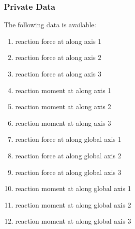 \subsubsection{Private Data}
The following data is available:
\begin{enumerate}
\item {} reaction force at  along  axis 1
\item {} reaction force at  along  axis 2
\item {} reaction force at  along  axis 3

\item {} reaction moment at  along  axis 1
\item {} reaction moment at  along  axis 2
\item {} reaction moment at  along  axis 3

\item {} reaction force at  along global axis 1
\item {} reaction force at  along global axis 2
\item {} reaction force at  along global axis 3

\item {} reaction moment at  along global axis 1
\item {} reaction moment at  along global axis 2
\item {} reaction moment at  along global axis 3
\end{enumerate}

